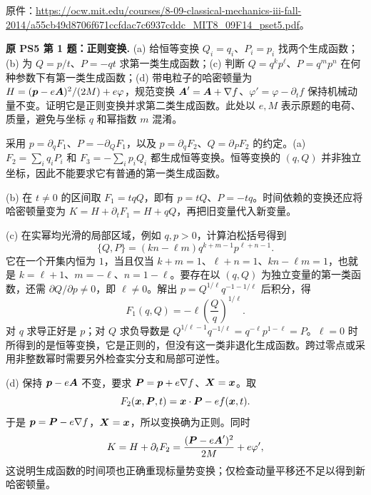 \begin{solution}
\end{solution}

原件：\url{https://ocw.mit.edu/courses/8-09-classical-mechanics-iii-fall-2014/a55cb49d8706f671ccfdac7c6937cddc_MIT8_09F14_pset5.pdf}。

\begin{example}
\textbf{原 PS5 第 1 题：正则变换.} 
(a) 给恒等变换 $Q_i=q_i$、$P_i=p_i$ 找两个生成函数；(b) 为 $Q=p/t$、$P=-qt$ 求第一类生成函数；(c) 判断 $Q=q^kp^\ell$、$P=q^mp^n$ 在何种参数下有第一类生成函数；(d) 带电粒子的哈密顿量为 $H=(\boldsymbol{p}-e\boldsymbol{A})^2/(2M)+e\varphi$，规范变换 $\boldsymbol{A}'=\boldsymbol{A}+\nabla f$、$\varphi'=\varphi-\partial_tf$ 保持机械动量不变。证明它是正则变换并求第二类生成函数。此处以 $e,M$ 表示原题的电荷、质量，避免与坐标 $q$ 和幂指数 $m$ 混淆。
\end{example}
\begin{solution}
采用 $p=\partial_qF_1$、$P=-\partial_QF_1$，以及 $p=\partial_qF_2$、$Q=\partial_PF_2$ 的约定。(a) $F_2=\sum_iq_iP_i$ 和 $F_3=-\sum_ip_iQ_i$ 都生成恒等变换。恒等变换的 $(q,Q)$ 并非独立坐标，因此不能要求它有普通的第一类生成函数。

(b) 在 $t\ne0$ 的区间取 $F_1=tqQ$，即有 $p=tQ$、$P=-tq$。时间依赖的变换还应将哈密顿量变为 $K=H+\partial_tF_1=H+qQ$，再把旧变量代入新变量。

(c) 在实幂均光滑的局部区域，例如 $q,p>0$，计算泊松括号得到
\[
 \{Q,P\}=(kn-\ell m)q^{k+m-1}p^{\ell+n-1}.
\]
它在一个开集内恒为 $1$，当且仅当 $k+m=1$、$\ell+n=1$、$kn-\ell m=1$，也就是 $k=\ell+1$、$m=-\ell$、$n=1-\ell$。要存在以 $(q,Q)$ 为独立变量的第一类函数，还需 $\partial Q/\partial p\ne0$，即 $\ell\ne0$。解出 $p=Q^{1/\ell}q^{-1-1/\ell}$ 后积分，得
\[
 F_1(q,Q)=-\ell\left(\frac Qq\right)^{1/\ell}.
\]
对 $q$ 求导正好是 $p$；对 $Q$ 求负导数是 $Q^{1/\ell-1}q^{-1/\ell}=q^{-\ell}p^{1-\ell}=P$。$\ell=0$ 时所得到的是恒等变换，它是正则的，但没有这一类非退化生成函数。跨过零点或采用非整数幂时需要另外检查实分支和局部可逆性。

(d) 保持 $\boldsymbol{p}-e\boldsymbol{A}$ 不变，要求 $\boldsymbol{P}=\boldsymbol{p}+e\nabla f$、$\boldsymbol{X}=\boldsymbol{x}$。取
\[
 F_2(\boldsymbol{x},\boldsymbol{P},t)=\boldsymbol{x}\cdot\boldsymbol{P}-e f(\boldsymbol{x},t).
\]
于是 $\boldsymbol{p}=\boldsymbol{P}-e\nabla f$，$\boldsymbol{X}=\boldsymbol{x}$，所以变换确为正则。同时
\[
 K=H+\partial_tF_2
 =\frac{(\boldsymbol{P}-e\boldsymbol{A}')^2}{2M}+e\varphi',
\]
这说明生成函数的时间项也正确重现标量势变换；仅检查动量平移还不足以得到新哈密顿量。
\end{solution}

